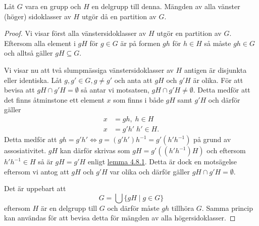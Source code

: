 \documentclass{article}
\theoremstyle{definition}
\begin{document}
\hypertarget{lemma4.2}{}
\begin{mylemma}{}{}
  Låt $G$ vara en grupp och $H$ en delgrupp till denna. 
  Mängden av alla vänster (höger) sidoklasser av $H$ utgör då en partition av $G$.
\end{mylemma}
\begin{proof}
  Vi visar först alla vänstersidoklasser av $H$ utgör en partition av $G$. 
  Eftersom alla element i $gH$ för $g \in G$ är på formen $gh$ för $h \in H$ så måste $gh \in G$
  och alltså gäller $gH \subseteq G$.

  Vi visar nu att två slumpmässiga vänstersidoklasser av $H$ antigen är disjunkta eller identiska.
  Låt
  $g, g' \in G, g \neq g'$ och anta att $gH$ och $g'H$ är olika. För att bevisa att 
  $gH \cap g'H = \emptyset$ så antar vi motsatsen, $gH \cap g'H \neq \emptyset$.
  Detta medför att det finns åtminstone ett element $x$ som finns i både $gH$ samt $g'H$ 
  och därför gäller
  \begin{align*}
    x &= gh, \; h \in H \\
    x &= g'h' \; h' \in H.
  \end{align*}
  Detta medför att $gh = g'h' \iff g = (g'h')h^{-1} = g'(h'h^{-1})$ på grund av assosiativitet.
  $gH$ kan därför skrivas som $gH = g'((h'h^{-1})H)$ och eftersom $h'h^{-1} \in H$ så är 
  $gH = g'H$ enligt \hyperlink{lemma4.1}{lemma 4.8.1}. Detta är dock en motsägelse eftersom vi antog att $gH$ och $g'H$ var olika och därför gäller $gH \cap g'H = \emptyset$.

  Det är uppebart att
  \[G = \bigcup \{gH \; |\; g \in G\}\]
  eftersom $H$ är en delgrupp till $G$ och därför måste $gh$ tillhöra $G$.
  Samma princip kan användas för att bevisa detta för mängden av alla
  högersidoklasser.
\end{proof}
\end{document}
